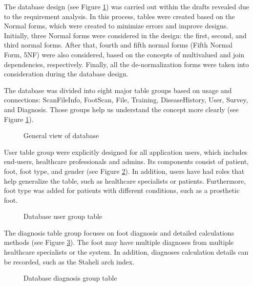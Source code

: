 The database design (see Figure \ref{fig:DatabaseGeneralView}) was carried out within the drafts revealed due to the requirement analysis. In this process, tables were created based on the Normal forms, which were created to minimize errors and improve designs. Initially, three Normal forms were considered in the design: the first, second, and third normal forms. After that, fourth and fifth normal forms (Fifth Normal Form, 5NF) were also considered, based on the concepts of multivalued and join dependencies, respectively. Finally, all the de-normalization forms were taken into consideration during the database design.

The database was divided into eight major table groups based on usage and connections: ScanFileInfo, FootScan, File, Training, DiseaseHistory, User, Survey, and Diagnosis. Those groups help us understand the concept more clearly (see Figure \ref{fig:DatabaseGeneralView}). 

\begin{figure}[htbp]
\centering
{}
\caption{General view of database}
\label{fig:DatabaseGeneralView}
\end{figure}

User table group were explicitly designed for all application users, which includes end-users, healthcare professionals and admins. Its components consist of patient, foot, foot type, and gender (see Figure \ref{fig:DatabaseUser}). In addition, users have had roles that help generalize the table, such as healthcare specialists or patients. Furthermore, foot type was added for patients with different conditions, such as a prosthetic foot.

\begin{figure}[htbp]
\centering
{}
\caption{Database user group table}
\label{fig:DatabaseUser}
\end{figure}

The diagnosis table group focuses on foot diagnosis and detailed calculations methods (see Figure \ref{fig:DatabaseDiagnosis}). The foot may have multiple diagnoses from multiple healthcare specialists or the system. In addition, diagnoses calculation details can be recorded, such as the Staheli arch index.

\begin{figure}[htbp]
\centering
{}
\caption{Database diagnosis group table}
\label{fig:DatabaseDiagnosis}
\end{figure}


